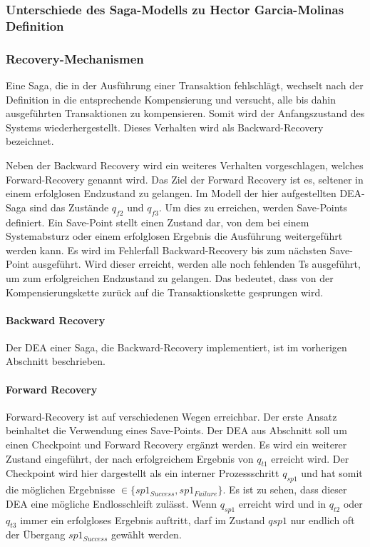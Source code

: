 \subsubsection{Unterschiede des Saga-Modells zu Hector Garcia-Molinas Definition}

\subsubsection{Recovery-Mechanismen} %
Eine Saga, die in der Ausführung einer Transaktion fehlschlägt, wechselt nach der Definition in die entsprechende Kompensierung und versucht, alle bis dahin ausgeführten Transaktionen zu kompensieren. Somit wird der Anfangszustand des Systems wiederhergestellt. Dieses Verhalten wird als Backward-Recovery bezeichnet. 

Neben der Backward Recovery wird ein weiteres Verhalten vorgeschlagen, welches Forward-Recovery genannt wird. Das Ziel der Forward Recovery ist es, seltener in einem erfolglosen Endzustand zu gelangen. Im Modell der hier aufgestellten DEA-Saga sind das Zustände $q_{f2}$ und $q_{f3}$. Um dies zu erreichen, werden Save-Points definiert. Ein Save-Point stellt einen Zustand dar, von dem bei einem Systemabsturz oder einem erfolglosen Ergebnis die Ausführung weitergeführt werden kann. Es wird im Fehlerfall Backward-Recovery bis zum nächsten Save-Point ausgeführt. Wird dieser erreicht, werden alle noch fehlenden Ts ausgeführt, um zum erfolgreichen Endzustand zu gelangen. Das bedeutet, dass von der Kompensierungskette zurück auf die Transaktionskette gesprungen wird.


\paragraph{Backward Recovery} %
Der DEA einer Saga, die Backward-Recovery implementiert, ist im vorherigen Abschnitt beschrieben.

\paragraph{Forward Recovery} %
Forward-Recovery ist auf verschiedenen Wegen erreichbar. Der erste Ansatz beinhaltet die Verwendung eines Save-Points. Der DEA aus Abschnitt soll um einen Checkpoint und Forward Recovery ergänzt werden. Es wird ein weiterer Zustand eingeführt, der nach erfolgreichem Ergebnis von $q_{t1}$ erreicht wird. Der Checkpoint wird hier dargestellt als ein interner Prozessschritt $q_{sp1}$ und hat somit die möglichen Ergebnisse $\in \{sp1_{Success}, sp1_{Failure}\}$. Es ist zu sehen, dass dieser DEA eine mögliche Endlosschleift zulässt. Wenn $q_{sp1}$ erreicht wird und in $q_{t2}$ oder $q_{t3}$ immer ein erfolgloses Ergebnis auftritt, darf im Zustand $qsp1$ nur endlich oft der Übergang $sp1_{Success}$ gewählt werden. 

